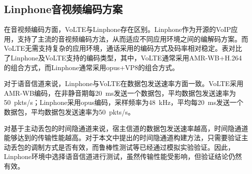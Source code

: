 \subsection{Linphone音视频编码方案}
\label{chap:linphone:motivation:coding}


在音视频编码方面，VoLTE与Linphone存在区别。Linphone作为开源的VoIP应用，支持了主流的音视频编码方法，从而适应不同应用环境之间的编解码方案。而VoLTE无需支持复杂的应用环境，通话采用的编码方式及码率相对稳定。表对比了Linphone及VoLTE支持的编码类型，其中，VoLTE通常采用AMR-WB+H.264的组合方式，而Linphone通常采用opus+VP8的组合方式。

对于语音信道来说，Linphone与VoLTE在数据包发送速率方面一致。VoLTE采用AMR-WB编码，在非静音期每{20\ ms}发送一个数据包，平均数据包发送速率为{50\ pkts/s}；Linphone采用opus编码，采样频率为{48\ kHz}，平均每{20\ ms}发送一个数据包，平均数据包发送速率为{50\ pkts/s}。

对基于主动丢包的时间隐通道来说，宿主信道的数据包发送速率越高，时间隐通道能够达到的传输性能越高。对于本文中提出的时间隐通道构建方法，只需要验证主动丢包的调制方式是否有效，而鲁棒性测试等已经通过模拟实验验证。因此，Linphone环境中选择语音信道进行测试，虽然传输性能受影响，但验证结论仍然有效。

